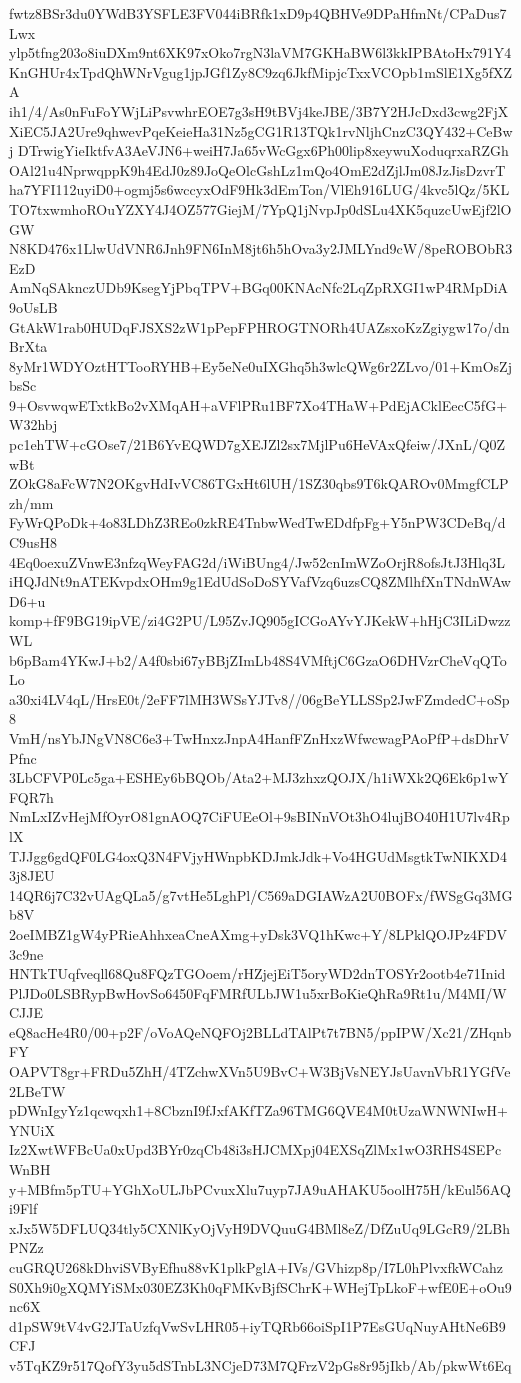 fwtz8BSr3du0YWdB3YSFLE3FV044iBRfk1xD9p4QBHVe9DPaHfmNt/CPaDus7Lwx
ylp5tfng203o8iuDXm9nt6XK97xOko7rgN3laVM7GKHaBW6l3kkIPBAtoHx791Y4
KnGHUr4xTpdQhWNrVgug1jpJGf1Zy8C9zq6JkfMipjcTxxVCOpb1mSlE1Xg5fXZA
ih1/4/As0nFuFoYWjLiPsvwhrEOE7g3sH9tBVj4keJBE/3B7Y2HJcDxd3cwg2FjX
XiEC5JA2Ure9qhwevPqeKeieHa31Nz5gCG1R13TQk1rvNljhCnzC3QY432+CeBwj
DTrwigYieIktfvA3AeVJN6+weiH7Ja65vWcGgx6Ph00lip8xeywuXoduqrxaRZGh
OAl21u4NprwqppK9h4EdJ0z89JoQeOlcGshLz1mQo4OmE2dZjlJm08JzJisDzvrT
ha7YFI112uyiD0+ogmj5s6wccyxOdF9Hk3dEmTon/VlEh916LUG/4kvc5lQz/5KL
TO7txwmhoROuYZXY4J4OZ577GiejM/7YpQ1jNvpJp0dSLu4XK5quzcUwEjf2lOGW
N8KD476x1LlwUdVNR6Jnh9FN6InM8jt6h5hOva3y2JMLYnd9cW/8peROBObR3EzD
AmNqSAknczUDb9KsegYjPbqTPV+BGq00KNAcNfc2LqZpRXGI1wP4RMpDiA9oUsLB
GtAkW1rab0HUDqFJSXS2zW1pPepFPHROGTNORh4UAZsxoKzZgiygw17o/dnBrXta
8yMr1WDYOztHTTooRYHB+Ey5eNe0uIXGhq5h3wlcQWg6r2ZLvo/01+KmOsZjbsSc
9+OsvwqwETxtkBo2vXMqAH+aVFlPRu1BF7Xo4THaW+PdEjACklEecC5fG+W32hbj
pc1ehTW+cGOse7/21B6YvEQWD7gXEJZl2sx7MjlPu6HeVAxQfeiw/JXnL/Q0ZwBt
ZOkG8aFcW7N2OKgvHdIvVC86TGxHt6lUH/1SZ30qbs9T6kQAROv0MmgfCLPzh/mm
FyWrQPoDk+4o83LDhZ3REo0zkRE4TnbwWedTwEDdfpFg+Y5nPW3CDeBq/dC9usH8
4Eq0oexuZVnwE3nfzqWeyFAG2d/iWiBUng4/Jw52cnImWZoOrjR8ofsJtJ3Hlq3L
iHQJdNt9nATEKvpdxOHm9g1EdUdSoDoSYVafVzq6uzsCQ8ZMlhfXnTNdnWAwD6+u
komp+fF9BG19ipVE/zi4G2PU/L95ZvJQ905gICGoAYvYJKekW+hHjC3ILiDwzzWL
b6pBam4YKwJ+b2/A4f0sbi67yBBjZImLb48S4VMftjC6GzaO6DHVzrCheVqQToLo
a30xi4LV4qL/HrsE0t/2eFF7lMH3WSsYJTv8//06gBeYLLSSp2JwFZmdedC+oSp8
VmH/nsYbJNgVN8C6e3+TwHnxzJnpA4HanfFZnHxzWfwcwagPAoPfP+dsDhrVPfnc
3LbCFVP0Lc5ga+ESHEy6bBQOb/Ata2+MJ3zhxzQOJX/h1iWXk2Q6Ek6p1wYFQR7h
NmLxIZvHejMfOyrO81gnAOQ7CiFUEeOl+9sBINnVOt3hO4lujBO40H1U7lv4RplX
TJJgg6gdQF0LG4oxQ3N4FVjyHWnpbKDJmkJdk+Vo4HGUdMsgtkTwNIKXD43j8JEU
14QR6j7C32vUAgQLa5/g7vtHe5LghPl/C569aDGIAWzA2U0BOFx/fWSgGq3MGb8V
2oeIMBZ1gW4yPRieAhhxeaCneAXmg+yDsk3VQ1hKwc+Y/8LPklQOJPz4FDV3c9ne
HNTkTUqfveqll68Qu8FQzTGOoem/rHZjejEiT5oryWD2dnTOSYr2ootb4e71Inid
PlJDo0LSBRypBwHovSo6450FqFMRfULbJW1u5xrBoKieQhRa9Rt1u/M4MI/WCJJE
eQ8acHe4R0/00+p2F/oVoAQeNQFOj2BLLdTAlPt7t7BN5/ppIPW/Xc21/ZHqnbFY
OAPVT8gr+FRDu5ZhH/4TZchwXVn5U9BvC+W3BjVsNEYJsUavnVbR1YGfVe2LBeTW
pDWnIgyYz1qcwqxh1+8CbznI9fJxfAKfTZa96TMG6QVE4M0tUzaWNWNIwH+YNUiX
Iz2XwtWFBcUa0xUpd3BYr0zqCb48i3sHJCMXpj04EXSqZlMx1wO3RHS4SEPcWnBH
y+MBfm5pTU+YGhXoULJbPCvuxXlu7uyp7JA9uAHAKU5oolH75H/kEul56AQi9Flf
xJx5W5DFLUQ34tly5CXNlKyOjVyH9DVQuuG4BMl8eZ/DfZuUq9LGcR9/2LBhPNZz
cuGRQU268kDhviSVByEfhu88vK1plkPglA+IVs/GVhizp8p/I7L0hPlvxfkWCahz
S0Xh9i0gXQMYiSMx030EZ3Kh0qFMKvBjfSChrK+WHejTpLkoF+wfE0E+oOu9nc6X
d1pSW9tV4vG2JTaUzfqVwSvLHR05+iyTQRb66oiSpI1P7EsGUqNuyAHtNe6B9CFJ
v5TqKZ9r517QofY3yu5dSTnbL3NCjeD73M7QFrzV2pGs8r95jIkb/Ab/pkwWt6Eq
